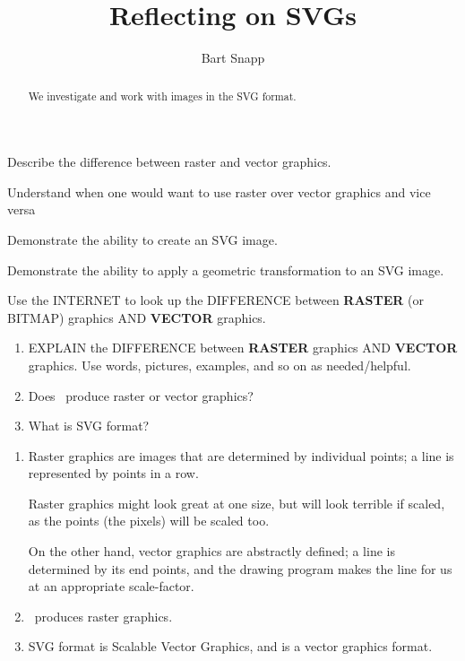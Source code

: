\documentclass[noauthor,nooutcomes,12pt,hints,handout]{ximera}
\author{Bart Snapp}
\title{Reflecting on SVGs}
\begin{document}
\begin{abstract}
  We investigate and work with images in the SVG format.
\end{abstract}
\maketitle

\begin{listOutcomes}
\item Describe the difference between raster and vector graphics.
\item Understand when one would want to use raster over vector
  graphics and vice versa
\item Demonstrate the ability to create an SVG image.
\item Demonstrate the ability to apply a geometric transformation to
  an SVG image.
\end{listOutcomes}



\begin{question}
  Use the INTERNET to look up the DIFFERENCE between \textbf{RASTER}
  (or BITMAP) graphics AND \textbf{VECTOR} graphics.

  \begin{enumerate}
  \item EXPLAIN the DIFFERENCE between \textbf{RASTER} graphics AND
    \textbf{VECTOR} graphics. Use words, pictures, examples, and so on
    as needed/helpful.
  \item Does \snap\ produce raster or vector graphics?
  \item What is SVG format?
  \end{enumerate}
  \begin{freeResponse}
    \begin{enumerate}
    \item Raster graphics are images that are determined by individual
      points; a line is represented by points in a row.

      Raster graphics might look great at one size, but will look
      terrible if scaled, as the points (the pixels) will be scaled
      too.
      
      On the other hand, vector graphics are abstractly defined; a line
      is determined by its end points, and the drawing program makes
      the line for us at an appropriate scale-factor.
    \item \snap\ produces raster graphics.
    \item SVG format is Scalable Vector Graphics, and is a vector
      graphics format.
    \end{enumerate}
  \end{freeResponse}
\end{question}
\mynewpage
\end{document}
